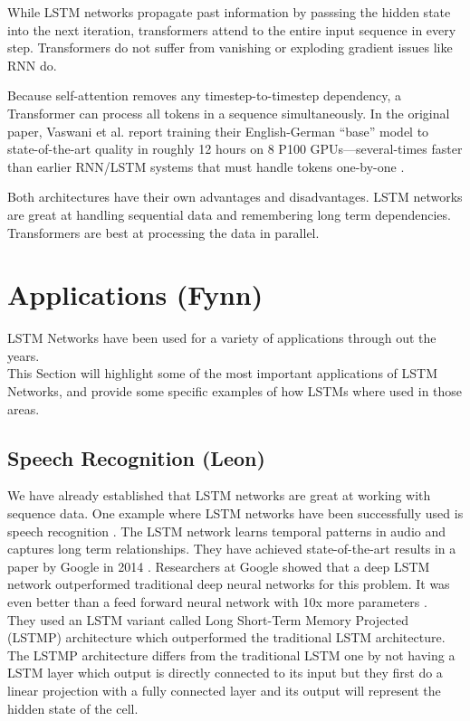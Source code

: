 \documentclass[twoside,a4paper,10pt,DIV=12,BCOR=12mm]{scrartcl}
\begin{document}
While LSTM networks propagate past information by passsing the hidden state into the next iteration, transformers attend to the entire input sequence in every
step. Transformers do not suffer from vanishing or exploding gradient issues like RNN do.


Because self-attention removes any timestep-to-timestep dependency, a Transformer can process all tokens in a sequence simultaneously. 
In the original paper, Vaswani et al. report training their English-German “base” model to state-of-the-art quality in roughly 
12 hours on 8 P100 GPUs—several-times faster than earlier RNN/LSTM systems that must handle tokens one-by-one \cite{vaswani2017attention}.


Both architectures have their own advantages and disadvantages. LSTM networks are great at handling sequential data and 
remembering long term dependencies. Transformers are best at processing the data in parallel.


\section{Applications (Fynn)}

LSTM Networks have been used for a variety of applications through out the years.\\
This Section will highlight some of the most important applications of LSTM Networks, and provide some specific examples of how LSTMs where used in those areas.

\subsection{Speech Recognition (Leon)}

We have already established that LSTM networks are great at working with sequence data. One example where LSTM networks
have been successfully used is speech recognition \cite{Graves04}. The LSTM network learns temporal patterns in audio and captures long 
term relationships. They have achieved state-of-the-art results in a paper by Google in 2014 \cite{sak2014longshorttermmemorybased}.
Researchers at Google showed that a deep LSTM network outperformed traditional deep neural networks for this problem.
It was even better than a feed forward neural network with 10x more parameters \cite{sak2014longshorttermmemorybased}.\\


They used an LSTM variant called Long Short-Term Memory Projected (LSTMP) architecture \cite{sak2014longshorttermmemorybased} which
outperformed the traditional LSTM architecture. The LSTMP architecture differs from the traditional LSTM one by not having a LSTM layer
which output is directly connected to its input but they first do a linear projection with a fully connected layer and its output will represent the 
hidden state of the cell.
\end{document}

